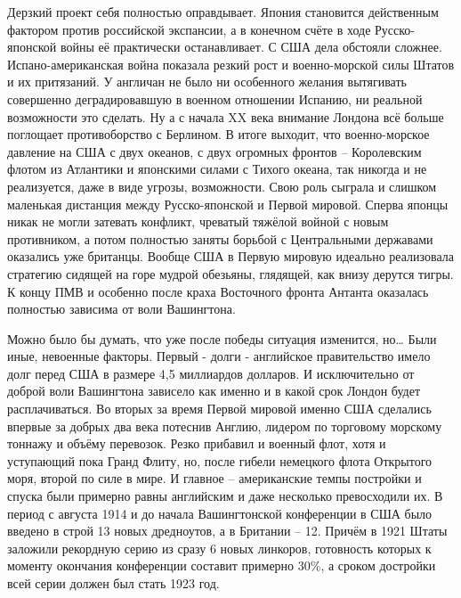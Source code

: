 Дерзкий проект себя полностью оправдывает. Япония становится действенным фактором против российской экспансии, а в конечном счёте в ходе Русско-японской войны её практически останавливает. С США дела обстояли сложнее. Испано-американская война показала резкий рост и военно-морской силы Штатов и их притязаний. У англичан не было ни особенного желания вытягивать совершенно деградировавшую в военном отношении Испанию, ни реальной возможности это сделать. Ну а с начала XX века внимание Лондона всё больше поглощает противоборство с Берлином. В итоге выходит, что военно-морское давление на США с двух океанов, с двух огромных фронтов – Королевским флотом из Атлантики и японскими силами с Тихого океана, так никогда и не реализуется, даже в виде угрозы, возможности. Свою роль сыграла и слишком маленькая дистанция между Русско-японской и Первой мировой. Сперва японцы никак не могли затевать конфликт, чреватый тяжёлой войной с новым противником, а потом полностью заняты борьбой с Центральными державами оказались уже британцы. Вообще США в Первую мировую идеально реализовала стратегию сидящей на горе мудрой обезьяны, глядящей, как внизу дерутся тигры. К концу ПМВ и особенно после краха Восточного фронта Антанта оказалась полностью зависима от воли Вашингтона.

Можно было бы думать, что уже после победы ситуация изменится, но… Были иные, невоенные факторы. Первый - долги - английское правительство имело долг перед США в размере 4,5 миллиардов долларов. И исключительно от доброй воли Вашингтона зависело как именно и в какой срок Лондон будет расплачиваться. Во вторых за время Первой мировой именно США сделались впервые за добрых два века потеснив Англию, лидером по торговому морскому тоннажу и объёму перевозок. Резко прибавил и военный флот, хотя и уступающий пока Гранд Флиту, но, после гибели немецкого флота Открытого моря, второй по силе в мире. И главное – американские темпы постройки и спуска были примерно равны английским и даже несколько превосходили их. В период с августа 1914 и до начала Вашингтонской конференции в США было введено в строй 13 новых дредноутов, а в Британии – 12. Причём в 1921 Штаты заложили рекордную серию из сразу 6 новых линкоров, готовность которых к моменту окончания конференции составит примерно 30\%, а сроком достройки всей серии должен был стать 1923 год. 

